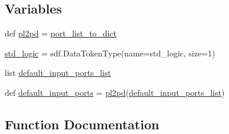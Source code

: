 \subsection*{Variables}
\begin{DoxyCompactItemize}
\item 
def \hyperlink{namespacesylva_1_1code__generation_1_1vhdl__generation_a10ea31d6ea98aa308e635b9403f5721f}{pl2pd} = \hyperlink{namespacesylva_1_1code__generation_1_1vhdl__generation_a51a60df4116e05e838a7d6c61f434df5}{port\+\_\+list\+\_\+to\+\_\+dict}
\item 
\hyperlink{namespacesylva_1_1code__generation_1_1vhdl__generation_a85e74939ca684a8a978805b5918467c8}{std\+\_\+logic} = sdf.\+Data\+Token\+Type(name=\textquotesingle{}std\+\_\+logic\textquotesingle{}, size=1)
\item 
list \hyperlink{namespacesylva_1_1code__generation_1_1vhdl__generation_a2373c5e8bd084e84746b1b6b947a2667}{default\+\_\+input\+\_\+ports\+\_\+list}
\item 
def \hyperlink{namespacesylva_1_1code__generation_1_1vhdl__generation_a0cf71880063e2c29029ca74b630eec28}{default\+\_\+input\+\_\+ports} = \hyperlink{namespacesylva_1_1code__generation_1_1vhdl__generation_a10ea31d6ea98aa308e635b9403f5721f}{pl2pd}(\hyperlink{namespacesylva_1_1code__generation_1_1vhdl__generation_a2373c5e8bd084e84746b1b6b947a2667}{default\+\_\+input\+\_\+ports\+\_\+list})
\end{DoxyCompactItemize}


\subsection{Function Documentation}
\mbox{\label{namespacesylva_1_1code__generation_1_1vhdl__generation_a94219128d04fd81a78200424dbf45356}} 
